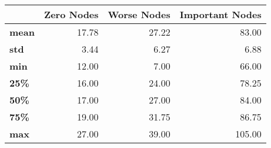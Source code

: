 \begin{tabular}{lrrr}
\toprule
{} &  Zero Nodes &  Worse Nodes &  Important Nodes \\
\midrule
\textbf{mean} &       17.78 &        27.22 &            83.00 \\
\textbf{std } &        3.44 &         6.27 &             6.88 \\
\textbf{min } &       12.00 &         7.00 &            66.00 \\
\textbf{25\% } &       16.00 &        24.00 &            78.25 \\
\textbf{50\% } &       17.00 &        27.00 &            84.00 \\
\textbf{75\% } &       19.00 &        31.75 &            86.75 \\
\textbf{max } &       27.00 &        39.00 &           105.00 \\
\bottomrule
\end{tabular}
